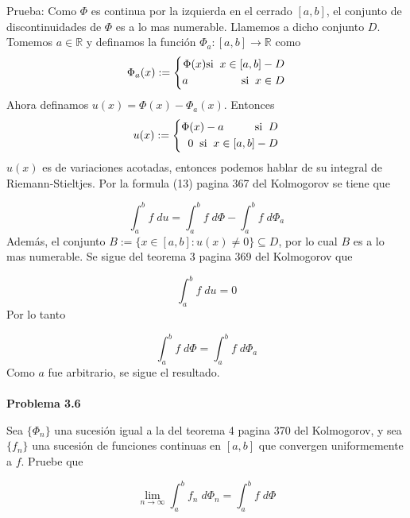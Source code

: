 \documentclass[12pt]{article}
\begin{document}
    Prueba: Como $\Phi$ es continua por la izquierda en el cerrado $[a,b]$, el 
    conjunto de discontinuidades  de $\Phi$ es a lo mas numerable. Llamemos a dicho 
    conjunto $D$. Tomemos 
    $a\in \mathbb{R}$ y definamos la funci\'on $\Phi_a:[a,b]\rightarrow \mathbb{R}$ como
    \begin{equation*}
        \Phi_a(x) := \left\{
            \begin{aligned}
               \Phi(x) \text{si}\;\; x\in [a,b]-D \\
               a \hspace*{48pt} \text{si}\;\; x\in D 
            \end{aligned}
        \right.
    \end{equation*}
    Ahora definamos $u(x) = \Phi(x)-\Phi_a(x)$. Entonces
    \begin{equation*}
        u(x) := \left\{
            \begin{aligned}
               \Phi(x)-a \hspace*{28pt} \text{si}\;\; D \\
               0\;\; \text{si}\;\; x\in [a,b]-D 
            \end{aligned}
        \right.
    \end{equation*}
    $u(x)$ es de variaciones acotadas, entonces podemos hablar de su integral de 
    Riemann-Stieltjes. Por la formula (13) pagina 367 del Kolmogorov se tiene que

    \[\int_a^b f\;du = \int_a^b f\;d\Phi-\int_a^b f\;d\Phi_a\]
    Adem\'as, el conjunto $B := \{x\in [a,b] : u(x) \neq 0\} \subseteq D$, por lo cual
    $B$ es a lo mas numerable. Se sigue del teorema 3 pagina 369 del Kolmogorov que 

    \[\int_a^b f\;du = 0\]
    Por lo tanto 

    \[\int_a^b f\;d\Phi = \int_a^b f\;d\Phi_a\]
    Como $a$ fue arbitrario, se sigue el resultado.
    \\ \\

    \textbf{Problema 3.6}

    Sea $\{\Phi_n\}$ una sucesi\'on igual a la del teorema 4 pagina 370 del Kolmogorov, y 
    sea $\{f_n\}$ una sucesi\'on de funciones continuas en $[a,b]$ que convergen 
    uniformemente a $f$. Pruebe que 

    \[\lim_{n\rightarrow \infty} \int_a^b f_n\;d\Phi_n = \int_a^b f\;d\Phi\]
    \\
\end{document}

